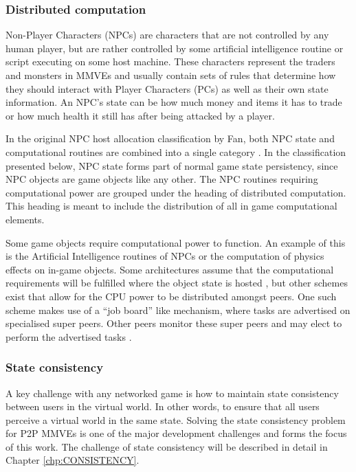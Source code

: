 \subsubsection{Distributed computation}

Non-Player Characters (NPCs) are characters that are not controlled by any human player, but are rather controlled by some artificial intelligence
routine or script executing on some host machine. These characters represent the traders and monsters in MMVEs and usually contain sets of rules that
determine how they should interact with Player Characters (PCs) as well as their own state information. An NPC's state can be how much money and
items it has to trade or how much health it still has after being attacked by a player.

In the original NPC host allocation classification by Fan, both NPC state and computational routines are combined into a single category
\cite{Fan_phd}. In the classification presented below, NPC state forms part of normal game state persistency, since NPC objects are game objects like
any other. The NPC routines requiring computational power are grouped under the heading of distributed computation. This heading is meant to include
the distribution of all in game computational elements.

Some game objects require computational power to function. An example of this is the Artificial Intelligence routines of NPCs or the computation of
physics effects on in-game objects. Some architectures assume that the computational requirements will be fulfilled where the object state is hosted
\cite{solipsis}, but other schemes exist that allow for the CPU power to be distributed amongst peers. One such scheme makes use of a ``job board''
like mechanism, where tasks are advertised on specialised super peers. Other peers monitor these super peers and may elect to perform the advertised
tasks \cite{fan_mediator_paper}.

\subsubsection{State consistency}
A key challenge with any networked game is how to maintain state consistency between users in the virtual world. In other words, to ensure that all users perceive a virtual world in the same state. Solving the state consistency problem for P2P MMVEs is one of the major development challenges and forms the focus of this work. The challenge of state consistency will be described in detail in Chapter \ref{chp:CONSISTENCY}.

